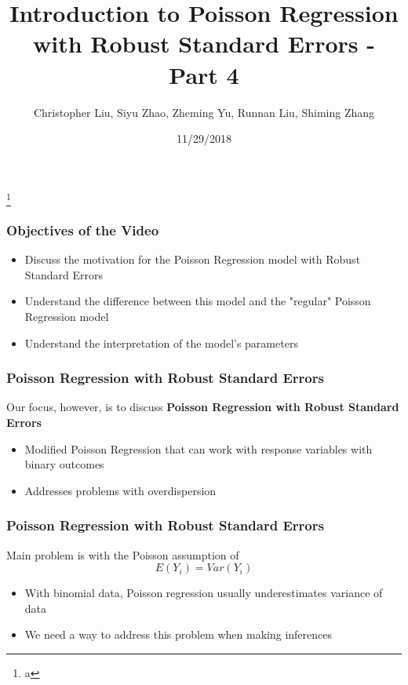\documentclass{beamer}
\title{Introduction to Poisson Regression with Robust Standard Errors - Part 4}
\author{Christopher Liu, Siyu Zhao, Zheming Yu, Runnan Liu, Shiming Zhang}
\institute{San Diego State University, Stats 610}
\date{11/29/2018}
\begin{document}
\begin{frame}[plain]

	\titlepage
	
	\footnote{a}

\end{frame}


	
\begin{frame}[fragile]\frametitle{Objectives of the Video}

	\begin{itemize}
	
		\item Discuss the motivation for the Poisson Regression model with Robust Standard Errors
			
		\item Understand the difference between this model and the "regular" Poisson Regression model		
				
		\item Understand the interpretation of the model's parameters
	
	\end{itemize}	

\end{frame}



\begin{frame}[fragile]\frametitle{Poisson Regression with Robust Standard Errors}
	
	Our focus, however, is to discuss \textbf{Poisson Regression with Robust Standard Errors}

	\begin{itemize}
	
		\item Modified Poisson Regression that can work with response variables with binary outcomes
		
		\item Addresses problems with overdispersion

	\end{itemize}
	
\end{frame}



\begin{frame}[fragile]\frametitle{Poisson Regression with Robust Standard Errors}

	Main problem is with the Poisson assumption of 	
	$$ E(Y_i) = Var(Y_i) $$ 

	\begin{itemize}

		\item With binomial data, Poisson regression usually underestimates variance of data
		
		\item We need a way to address this problem when making inferences

	\end{itemize}
	
\end{frame}
\end{document}
